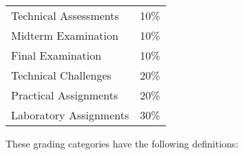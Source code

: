 \documentclass[11pt]{article}
\begin{document}
\begin{center}

  \begin{tabular}{ll}
    Technical Assessments      & 10\% \\
    Midterm Examination        & 10\% \\
    Final Examination          & 10\% \\
    Technical Challenges       & 20\% \\
    Practical Assignments      & 20\% \\
    Laboratory Assignments     & 30\%
  \end{tabular}

\end{center}

\noindent
These grading categories have the following definitions:
\end{document}
